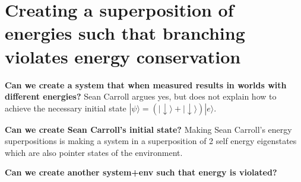 \documentclass{article}
\begin{document}
\section{Creating a superposition of energies such that branching violates energy conservation}

\textbf{Can we create a system that when measured results in worlds with different energies?} Sean Carroll argues yes, but does not explain how to achieve the necessary initial state $|\psi\rangle=(|\downarrow\rangle+|\downarrow\rangle)|e\rangle$. 

\textbf{Can we create Sean Carroll's initial state?} Making Sean Carroll's energy superpositions is making a system in a superposition of 2 self energy eigenstates which are also pointer states of the environment.

\textbf{Can we create another system+env such that energy is violated?}




\end{document}
